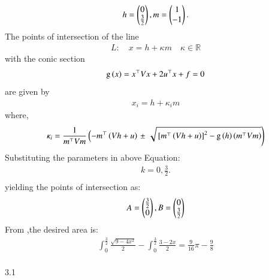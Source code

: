 \documentclass[journal]{IEEEtran}
\begin{document}
\begin{align}
    h=\begin{pmatrix}0\\ \frac{3}{2}\end{pmatrix},m=\begin{pmatrix}1\\-1\end{pmatrix}.
\end{align}
The points of intersection of the line 
\begin{align}
L: \quad x = h + \kappa m \quad \kappa \in \mathbb{R}
\label{eq:conic_tangent}
\end{align}
with the conic section \begin{align}
	\text{g}\left(x\right) = x^{\top}Vx+2u^{\top}x+f=0
    \end{align} are given by
\begin{align}
x_i = h + \kappa_im
	\label{eq:chord-pts}
\end{align}
where,
    \begin{multline}
\kappa_i = \frac{1}
{
m^{\top}Vm
}
\left(-m^{\top}\left(Vh+u\right)\right.
\pm
\left.\sqrt{
{}\left[
m^{\top}\left(Vh+u\right)
\right]^2
	-\text{g}
\left(h
\right)
\left(m^{\top}Vm\right)
}
\right)
\label{eq:app-tangent_roots}
\end{multline}
Substituting the parameters in above Equation:\\
\begin{align}
    k=0,\frac{3}{2}.\\
\end{align}
yielding the points of intersection as:\\
\begin{align}
    A=\begin{pmatrix}\frac{3}{2}\\0\end{pmatrix},B=\begin{pmatrix}0\\ \frac{3}{2}\end{pmatrix}
\end{align}
From ,the desired area is:\\
\begin{align}
\int_{0}^{\frac{3}{2}}\frac{\sqrt{9-4x^2}}{2}-\int_{0}^{\frac{3}{2}}\frac{3-2x}{2}=\frac{9}{16}\pi-\frac{9}{8}\\
\end{align}
\begin{table}[h]
    \centering
    
    \caption{3.1}
    \label{}
\end{table}
\end{document}
